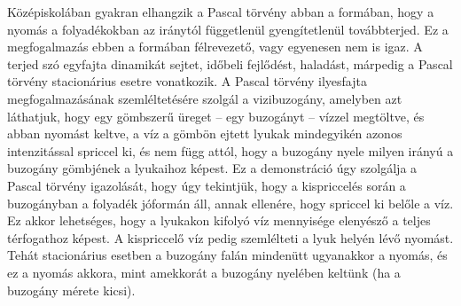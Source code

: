 \documentclass[12pt,a4paper]{scrartcl}
\begin{document}
Középiskolában gyakran elhangzik a Pascal törvény abban a formában, hogy a nyomás a folyadékokban az iránytól függetlenül gyengítetlenül továbbterjed. Ez a megfogalmazás ebben a formában félrevezető, vagy egyenesen nem is igaz. A terjed szó egyfajta dinamikát sejtet, időbeli fejlődést, haladást, márpedig a Pascal törvény stacionárius esetre vonatkozik. A Pascal törvény ilyesfajta megfogalmazásának szemléltetésére szolgál a vizibuzogány, amelyben azt láthatjuk, hogy egy gömbszerű üreget -- egy buzogányt -- vízzel megtöltve, és abban nyomást keltve, a víz a gömbön ejtett lyukak mindegyikén azonos intenzitással spriccel ki, és nem függ attól, hogy a buzogány nyele milyen irányú a buzogány gömbjének a lyukaihoz képest. Ez a demonstráció úgy szolgálja a Pascal törvény igazolását, hogy úgy tekintjük, hogy a kispriccelés során a buzogányban a folyadék jóformán áll, annak ellenére, hogy spriccel ki belőle a víz. Ez akkor lehetséges, hogy a lyukakon kifolyó víz mennyisége elenyésző a teljes térfogathoz képest. A kispriccelő víz pedig szemlélteti a lyuk helyén lévő nyomást. Tehát stacionárius esetben a buzogány falán mindenütt ugyanakkor a nyomás, és ez a nyomás akkora, mint amekkorát a buzogány nyelében keltünk (ha a buzogány mérete kicsi).
\end{document}
